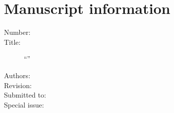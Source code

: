 \section*{Manuscript information}

\begin{description}
\item[Number:] \PaperId
\item[Title:] ``\PaperTitle''
\item[Authors:] \AuthorsInLetter
\item[Revision:] \PaperRevision
\item[Submitted to:] \Journal
\item[Special issue:] \SpecialIssueId
\end{description}
